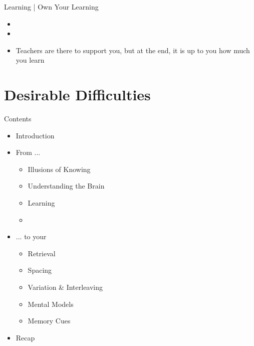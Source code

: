\documentclass{ercisbeamer}
\begin{document}
\begin{frame}{Learning | Own Your Learning}
    \begin{tbox}
        \begin{itemize}
            \item {}
            \item {}
            \item Teachers are there to support you, but at the end, it is up to you how much you learn
        \end{itemize}
    \end{tbox}
\end{frame}
\setbgimage{}

\section{Desirable Difficulties}
\begin{frame}{Contents}
    \begin{itemize}
        \item Introduction
        \item From ...
        \begin{itemize}
            \item Illusions of Knowing
            \item Understanding the Brain
            \item Learning
            \item {}
        \end{itemize}
        \item ... to your 
        \begin{itemize}
            \item Retrieval
            \item Spacing
            \item Variation \& Interleaving
            \item Mental Models
            \item Memory Cues
        \end{itemize}
        \item Recap
    \end{itemize}
\end{frame}
\end{document}
